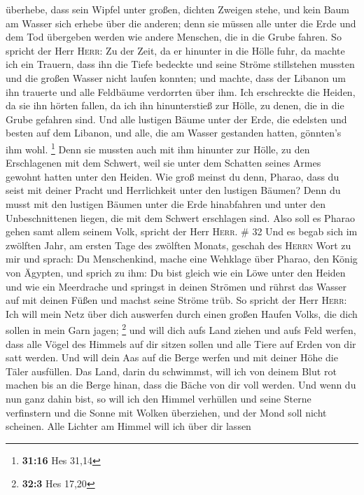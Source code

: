 überhebe, dass sein Wipfel unter großen, dichten Zweigen stehe, und kein
Baum am Wasser sich erhebe über die anderen; denn sie müssen alle unter
die Erde und dem Tod übergeben werden wie andere Menschen, die in die
Grube fahren.  So spricht der Herr \textsc{Herr}: Zu der
Zeit, da er hinunter in die Hölle fuhr, da machte ich ein Trauern, dass
ihn die Tiefe bedeckte und seine Ströme stillstehen mussten und die
großen Wasser nicht laufen konnten; und machte, dass der Libanon um ihn
trauerte und alle Feldbäume verdorrten über ihm.  Ich
erschreckte die Heiden, da sie ihn hörten fallen, da ich ihn
hinunterstieß zur Hölle, zu denen, die in die Grube gefahren sind. Und
alle lustigen Bäume unter der Erde, die edelsten und besten auf dem
Libanon, und alle, die am Wasser gestanden hatten, gönnten's ihm wohl.
\footnote{\textbf{31:16} Hes 31,14}  Denn sie mussten
auch mit ihm hinunter zur Hölle, zu den Erschlagenen mit dem Schwert,
weil sie unter dem Schatten seines Armes gewohnt hatten unter den
Heiden.  Wie groß meinst du denn, Pharao, dass du seist
mit deiner Pracht und Herrlichkeit unter den lustigen Bäumen? Denn du
musst mit den lustigen Bäumen unter die Erde hinabfahren und unter den
Unbeschnittenen liegen, die mit dem Schwert erschlagen sind. Also soll
es Pharao gehen samt allem seinem Volk, spricht der Herr \textsc{Herr}.
\# 32  Und es begab sich im zwölften Jahr, am ersten Tage
des zwölften Monats, geschah des \textsc{Herrn} Wort zu mir und sprach:
 Du Menschenkind, mache eine Wehklage über Pharao, den
König von Ägypten, und sprich zu ihm: Du bist gleich wie ein Löwe unter
den Heiden und wie ein Meerdrache und springst in deinen Strömen und
rührst das Wasser auf mit deinen Füßen und machst seine Ströme trüb.
 So spricht der Herr \textsc{Herr}: Ich will mein Netz
über dich auswerfen durch einen großen Haufen Volks, die dich sollen in
mein Garn jagen; \footnote{\textbf{32:3} Hes 17,20}  und
will dich aufs Land ziehen und aufs Feld werfen, dass alle Vögel des
Himmels auf dir sitzen sollen und alle Tiere auf Erden von dir satt
werden.  Und will dein Aas auf die Berge werfen und mit
deiner Höhe die Täler ausfüllen.  Das Land, darin du
schwimmst, will ich von deinem Blut rot machen bis an die Berge hinan,
dass die Bäche von dir voll werden.  Und wenn du nun ganz
dahin bist, so will ich den Himmel verhüllen und seine Sterne
verfinstern und die Sonne mit Wolken überziehen, und der Mond soll nicht
scheinen.  Alle Lichter am Himmel will ich über dir lassen
